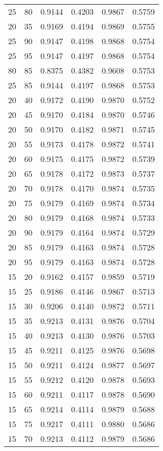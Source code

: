 \begin{center}
\begin{longtable}{|l|l|l|l|l|l|}
25 & 80 & 0.9144 & 0.4203 & 0.9867 & 0.5759 \\
20 & 35 & 0.9169 & 0.4194 & 0.9869 & 0.5755 \\
25 & 90 & 0.9147 & 0.4198 & 0.9868 & 0.5754 \\
25 & 95 & 0.9147 & 0.4197 & 0.9868 & 0.5754 \\
80 & 85 & 0.8375 & 0.4382 & 0.9608 & 0.5753 \\
25 & 85 & 0.9144 & 0.4197 & 0.9868 & 0.5753 \\
20 & 40 & 0.9172 & 0.4190 & 0.9870 & 0.5752 \\
20 & 45 & 0.9170 & 0.4184 & 0.9870 & 0.5746 \\
20 & 50 & 0.9170 & 0.4182 & 0.9871 & 0.5745 \\
20 & 55 & 0.9173 & 0.4178 & 0.9872 & 0.5741 \\
20 & 60 & 0.9175 & 0.4175 & 0.9872 & 0.5739 \\
20 & 65 & 0.9178 & 0.4172 & 0.9873 & 0.5737 \\
20 & 70 & 0.9178 & 0.4170 & 0.9874 & 0.5735 \\
20 & 75 & 0.9179 & 0.4169 & 0.9874 & 0.5734 \\
20 & 80 & 0.9179 & 0.4168 & 0.9874 & 0.5733 \\
20 & 90 & 0.9179 & 0.4164 & 0.9874 & 0.5729 \\
20 & 85 & 0.9179 & 0.4163 & 0.9874 & 0.5728 \\
20 & 95 & 0.9179 & 0.4163 & 0.9874 & 0.5728 \\
15 & 20 & 0.9162 & 0.4157 & 0.9859 & 0.5719 \\
15 & 25 & 0.9186 & 0.4146 & 0.9867 & 0.5713 \\
15 & 30 & 0.9206 & 0.4140 & 0.9872 & 0.5711 \\
15 & 35 & 0.9213 & 0.4131 & 0.9876 & 0.5704 \\
15 & 40 & 0.9213 & 0.4130 & 0.9876 & 0.5703 \\
15 & 45 & 0.9211 & 0.4125 & 0.9876 & 0.5698 \\
15 & 50 & 0.9211 & 0.4124 & 0.9877 & 0.5697 \\
15 & 55 & 0.9212 & 0.4120 & 0.9878 & 0.5693 \\
15 & 60 & 0.9211 & 0.4117 & 0.9878 & 0.5690 \\
15 & 65 & 0.9214 & 0.4114 & 0.9879 & 0.5688 \\
15 & 75 & 0.9217 & 0.4111 & 0.9880 & 0.5686 \\
15 & 70 & 0.9213 & 0.4112 & 0.9879 & 0.5686 \\

\end{longtable}
\end{center}
